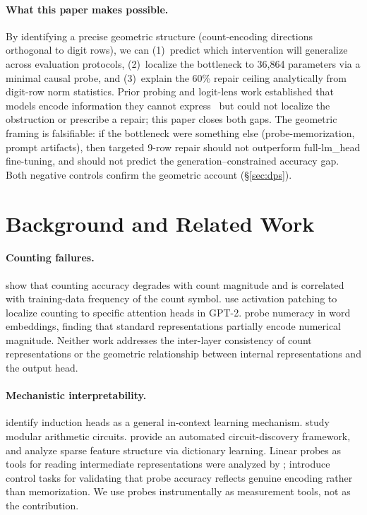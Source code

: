 \documentclass{article}
\begin{document}
\paragraph{What this paper makes possible.}
By identifying a precise geometric structure (count-encoding directions orthogonal to digit rows), we can (1)~predict which intervention will generalize across evaluation protocols, (2)~localize the bottleneck to 36{,}864 parameters via a minimal causal probe, and (3)~explain the 60\% repair ceiling analytically from digit-row norm statistics.
Prior probing and logit-lens work established that models encode information they cannot express~\citep{alain2016understanding,nostalgebraist2020logitlens} but could not localize the obstruction or prescribe a repair; this paper closes both gaps.
The geometric framing is falsifiable: if the bottleneck were something else (probe-memorization, prompt artifacts), then targeted 9-row repair should not outperform full-lm\_head fine-tuning, and should not predict the generation--constrained accuracy gap. Both negative controls confirm the geometric account (\S\ref{sec:dps}).

\section{Background and Related Work}
\label{sec:background}

\paragraph{Counting failures.}
\citet{razeghi2022impact} show that counting accuracy degrades with count magnitude and
is correlated with training-data frequency of the count symbol.
\citet{stolfo2023mechanistic} use activation patching to localize counting to specific
attention heads in GPT-2.
\citet{wallace2019nlp} probe numeracy in word embeddings, finding that standard
representations partially encode numerical magnitude.
Neither work addresses the inter-layer consistency of count representations
or the geometric relationship between internal representations and the output head.

\paragraph{Mechanistic interpretability.}
\citet{olsson2022context} identify induction heads as a general in-context learning mechanism.
\citet{nanda2023progress} study modular arithmetic circuits.
\citet{conmy2023acdc} provide an automated circuit-discovery framework,
and \citet{bricken2023monosemanticity} analyze sparse feature structure via dictionary learning.
Linear probes as tools for reading intermediate representations were analyzed by
\citet{alain2016understanding}; \citet{hewitt2019designing} introduce control tasks
for validating that probe accuracy reflects genuine encoding rather than memorization.
We use probes instrumentally as measurement tools, not as the contribution.
\end{document}
